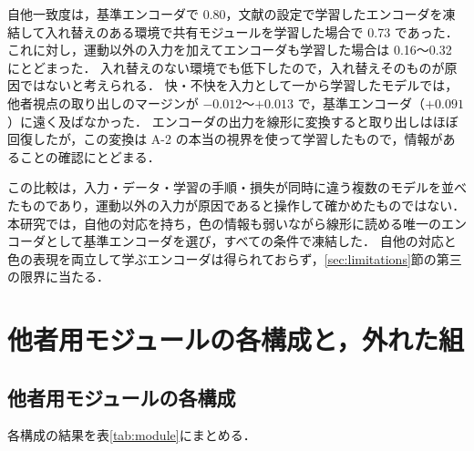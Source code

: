\begin{table}[t]
  \centering
  \small
  \caption{視覚エンコーダの扱いと自他一致度}
  \label{tab:alignment}
  
\end{table}

自他一致度は，基準エンコーダで 0.80，文献\cite{noguchi2022superposition}の設定で学習したエンコーダを凍結して入れ替えのある環境で共有モジュールを学習した場合で 0.73 であった．
これに対し，運動以外の入力を加えてエンコーダも学習した場合は 0.16〜0.32 にとどまった．
入れ替えのない環境でも低下したので，入れ替えそのものが原因ではないと考えられる．
快・不快を入力として一から学習したモデルでは，他者視点の取り出しのマージンが $-0.012$〜$+0.013$ で，基準エンコーダ（$+0.091$）に遠く及ばなかった．
エンコーダの出力を線形に変換すると取り出しはほぼ回復したが，この変換は A-2 の本当の視界を使って学習したもので，情報があることの確認にとどまる．

この比較は，入力・データ・学習の手順・損失が同時に違う複数のモデルを並べたものであり，運動以外の入力が原因であると操作して確かめたものではない．
本研究では，自他の対応を持ち，色の情報も弱いながら線形に読める唯一のエンコーダとして基準エンコーダを選び，すべての条件で凍結した．
自他の対応と色の表現を両立して学ぶエンコーダは得られておらず，\ref{sec:limitations}節の第三の限界に当たる．

\section{他者用モジュールの各構成と，外れた組}\label{app:component}

\subsection{他者用モジュールの各構成}
各構成の結果を表\ref{tab:module}にまとめる．

